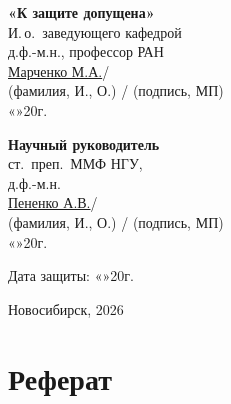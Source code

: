 \documentclass[14pt,a4paper]{extarticle}
\numberwithin{table}{section}
\numberwithin{figure}{section}
\numberwithin{equation}{section}
\begin{document}
{\noindent
\begin{minipage}[t]{0.48\textwidth}
\textbf{«К защите допущена»}\\[0.3em]
И.\,о.\ заведующего кафедрой\\
д.ф.-м.н., профессор РАН\\[0.3em]
\underline{\hspace{1em}Марченко М.А.\hspace{1em}}/\underline{\hspace{2.5em}}\\
{\small (фамилия, И., О.) / (подпись, МП)}\\[0.3em]
«\underline{\hspace{1.5em}}»\underline{\hspace{4em}}20\underline{\hspace{1em}}г.
\end{minipage}\hfill
\begin{minipage}[t]{0.48\textwidth}
\textbf{Научный руководитель}\\[0.3em]
ст.\ преп.\ ММФ НГУ,\\
д.ф.-м.н.\\[0.3em]
\underline{\hspace{1em}Пененко А.В.\hspace{1em}}/\underline{\hspace{2.5em}}\\
{\small (фамилия, И., О.) / (подпись, МП)}\\[0.3em]
«\underline{\hspace{1.5em}}»\underline{\hspace{4em}}20\underline{\hspace{1em}}г.
\end{minipage}

\vspace{2.5em}

\hfill Дата защиты: «\underline{\hspace{1.5em}}»\underline{\hspace{5em}}20\underline{\hspace{1em}}г.

\vfill

\begin{center}
Новосибирск, 2026
\end{center}
}

\newpage

\section*{Реферат}\label{ux440ux435ux444ux435ux440ux430ux442}
\end{document}
